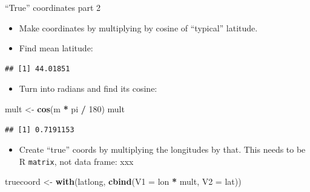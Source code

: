 \documentclass[ignorenonframetext,]{beamer}
\newenvironment{Shaded}{\begin{snugshade}}{\end{snugshade}}
\newcommand{\DataTypeTok}[1]{\textcolor[rgb]{0.13,0.29,0.53}{#1}}
\newcommand{\DecValTok}[1]{\textcolor[rgb]{0.00,0.00,0.81}{#1}}
\newcommand{\KeywordTok}[1]{\textcolor[rgb]{0.13,0.29,0.53}{\textbf{#1}}}
\newcommand{\NormalTok}[1]{#1}
\newcommand{\OperatorTok}[1]{\textcolor[rgb]{0.81,0.36,0.00}{\textbf{#1}}}
\newcommand{\StringTok}[1]{\textcolor[rgb]{0.31,0.60,0.02}{#1}}
\providecommand{\tightlist}{%
  \setlength{\itemsep}{0pt}\setlength{\parskip}{0pt}}
\begin{document}
\begin{frame}[fragile]{``True'' coordinates part 2}
\protect\hypertarget{true-coordinates-part-2}{}

\begin{itemize}
\item
  Make coordinates by multiplying by cosine of ``typical'' latitude.
\item
  Find mean latitude:
\end{itemize}

\begin{Shaded}
\end{Shaded}

\begin{verbatim}
## [1] 44.01851
\end{verbatim}

\begin{itemize}
\tightlist
\item
  Turn into radians and find its cosine:
\end{itemize}

\begin{Shaded}
\begin{Highlighting}[]
\NormalTok{mult <-}\StringTok{ }\KeywordTok{cos}\NormalTok{(m }\OperatorTok{*}\StringTok{ }\NormalTok{pi }\OperatorTok{/}\StringTok{ }\DecValTok{180}\NormalTok{)}
\NormalTok{mult}
\end{Highlighting}
\end{Shaded}

\begin{verbatim}
## [1] 0.7191153
\end{verbatim}

\begin{itemize}
\tightlist
\item
  Create ``true'' coords by multiplying the longitudes by that. This
  needs to be R \texttt{matrix}, not data frame: xxx
\end{itemize}

\footnotesize

\begin{Shaded}
\begin{Highlighting}[]
\NormalTok{truecoord <-}\StringTok{ }\KeywordTok{with}\NormalTok{(latlong, }\KeywordTok{cbind}\NormalTok{(}\DataTypeTok{V1 =}\NormalTok{ lon }\OperatorTok{*}\StringTok{ }\NormalTok{mult, }\DataTypeTok{V2 =}\NormalTok{ lat))}
\end{Highlighting}
\end{Shaded}

\normalsize

\end{frame}
\end{document}
